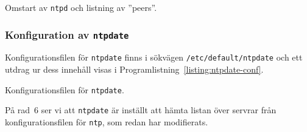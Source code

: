 \begin{listing}[H]
\caption[Omstart av \texttt{ntpd}]{Omstart av \texttt{ntpd} och listning av ''peers''.}
\label{listing:ntp-reload-list}
\end{listing}


\subsubsection{Konfiguration av \texttt{ntpdate}}
Konfigurationsfilen för \texttt{ntpdate} finns i sökvägen \texttt{/etc/default/ntpdate}
och ett utdrag ur dess innehåll visas i Programlistning~\ref{listing:ntpdate-conf}.

\begin{listing}[H]
\caption{Konfigurationsfilen för \texttt{ntpdate}.}
\label{listing:ntpdate-conf}
\end{listing}

På rad~6 ser vi att \texttt{ntpdate} är inställt att hämta listan över
servrar från konfigurationsfilen för \texttt{ntp}, som redan har modifierats.
